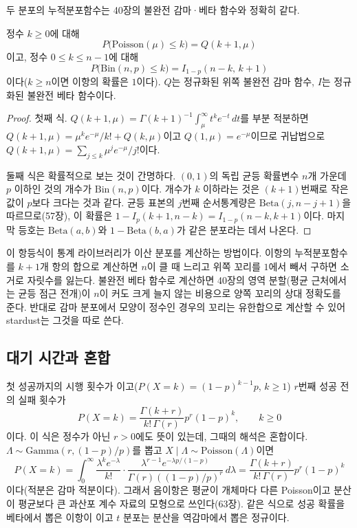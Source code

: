 두 분포의 누적분포함수는 40장의 불완전 감마·베타 함수와 정확히 같다.

\begin{proposition}
\label{prop:cdf-identities}
정수 $k\ge0$에 대해
\[
P\bigl(\mathrm{Poisson}(\mu)\le k\bigr)=Q(k+1,\mu)
\]
이고, 정수 $0\le k\le n-1$에 대해
\[
P\bigl(\mathrm{Bin}(n,p)\le k\bigr)=I_{1-p}(n-k,\,k+1)
\]
이다($k\ge n$이면 이항의 확률은 $1$이다). $Q$는 정규화된 위쪽 불완전 감마 함수, $I$는 정규화된 불완전 베타 함수이다.
\end{proposition}

\begin{proof}
첫째 식. $Q(k+1,\mu)=\Gamma(k+1)^{-1}\int_\mu^\infty t^ke^{-t}\,dt$를 부분 적분하면 $Q(k+1,\mu)=\mu^ke^{-\mu}/k!+Q(k,\mu)$이고 $Q(1,\mu)=e^{-\mu}$이므로 귀납법으로 $Q(k+1,\mu)=\sum_{j\le k}\mu^je^{-\mu}/j!$이다.

둘째 식은 확률적으로 보는 것이 간명하다. $(0,1)$의 독립 균등 확률변수 $n$개 가운데 $p$ 이하인 것의 개수가 $\mathrm{Bin}(n,p)$이다. 개수가 $k$ 이하라는 것은 $(k+1)$번째로 작은 값이 $p$보다 크다는 것과 같다. 균등 표본의 $j$번째 순서통계량은 $\mathrm{Beta}(j,n-j+1)$을 따르므로(57장), 이 확률은 $1-I_p(k+1,n-k)=I_{1-p}(n-k,k+1)$이다. 마지막 등호는 $\mathrm{Beta}(a,b)$와 $1-\mathrm{Beta}(b,a)$가 같은 분포라는 데서 나온다.
\end{proof}

이 항등식이 통계 라이브러리가 이산 분포를 계산하는 방법이다. 이항의 누적분포함수를 $k+1$개 항의 합으로 계산하면 $n$이 클 때 느리고 위쪽 꼬리를 $1$에서 빼서 구하면 소거로 자릿수를 잃는다. 불완전 베타 함수로 계산하면 40장의 영역 분할(평균 근처에서는 균등 점근 전개)이 $n$이 커도 크게 늘지 않는 비용으로 양쪽 꼬리의 상대 정확도를 준다. 반대로 감마 분포에서 모양이 정수인 경우의 꼬리는 유한합으로 계산할 수 있어 stardust는 그것을 따로 쓴다.

\subsection{대기 시간과 혼합}

첫 성공까지의 시행 횟수가 이고($P(X=k)=(1-p)^{k-1}p$, $k\ge1$) $r$번째 성공 전의 실패 횟수가 
\[
P(X=k)=\frac{\Gamma(k+r)}{k!\,\Gamma(r)}p^r(1-p)^k,\qquad k\ge0
\]
이다. 이 식은 정수가 아닌 $r>0$에도 뜻이 있는데, 그때의 해석은 혼합이다. $\Lambda\sim\mathrm{Gamma}(r,(1-p)/p)$를 뽑고 $X\mid\Lambda\sim\mathrm{Poisson}(\Lambda)$이면
\[
P(X=k)=\int_0^\infty\frac{\lambda^ke^{-\lambda}}{k!}\cdot\frac{\lambda^{r-1}e^{-\lambda p/(1-p)}}{\Gamma(r)((1-p)/p)^r}\,d\lambda=\frac{\Gamma(k+r)}{k!\,\Gamma(r)}p^r(1-p)^k
\]
이다(적분은 감마 적분이다). 그래서 음이항은 평균이 개체마다 다른 Poisson이고 분산이 평균보다 큰 과산포 계수 자료의 모형으로 쓰인다(63장). 같은 식으로 성공 확률을 베타에서 뽑은 이항이 이고 $t$ 분포는 분산을 역감마에서 뽑은 정규이다.

